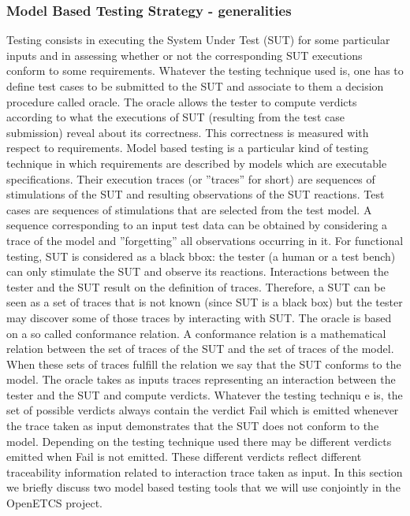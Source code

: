 \documentclass{template/openetcs_report}
\begin{document}
\subsubsection{Model Based Testing Strategy - generalities}
Testing consists in executing the System Under Test (SUT)
 for some particular inputs and in assessing whether or not the
 corresponding SUT executions conform to some requirements.
 Whatever the testing technique used is, one has to define test cases
 to be submitted to the SUT and associate to them a decision procedure
 called oracle. The oracle allows the tester to compute verdicts according 
to what the executions of SUT (resulting from the test case submission) 
reveal about its correctness.
This correctness is measured with respect to requirements. Model based
 testing is a particular kind of testing technique in which requirements are 
described by models which are executable specifications. Their execution
 traces (or ”traces” for short) are sequences of stimulations of the SUT and
 resulting observations of the SUT reactions. Test cases are sequences of 
stimulations that are selected from the test model. A sequence corresponding
 to an input test data can be obtained by considering a trace of the model and
 ”forgetting” all observations occurring in it. For functional testing, SUT is 
considered as a black bbox: the tester (a human or a test bench) can only
 stimulate the SUT and observe its reactions. Interactions between the tester
 and the SUT result on the definition of traces. Therefore, a SUT can be seen
 as a set of traces that is not known (since SUT is a black box) but the tester
 may discover some of those traces by interacting with SUT. The oracle is based
 on a so called conformance relation. A conformance relation is a mathematical
 relation between the set of traces of the SUT and the set of traces of the model.
 When these sets of traces fulfill the relation we say that the SUT conforms to 
the model. The oracle takes as inputs traces representing an interaction between
 the tester and the SUT and compute verdicts. Whatever the testing techniqu
e is, the set of possible verdicts always contain the verdict Fail which is emitted 
whenever the trace taken as input demonstrates that the SUT does not conform 
to the model. Depending on the testing technique used there may be different 
verdicts emitted when Fail is not emitted. These different verdicts reflect different
 traceability information related to interaction trace taken as input. In this section
 we briefly discuss two model based testing tools that we will use conjointly in the 
OpenETCS project.
\end{document}
